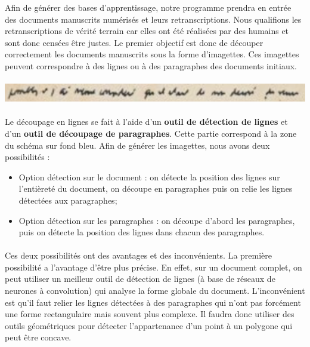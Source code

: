 Afin de générer des bases d’apprentissage, notre programme prendra en entrée des documents manuscrits
numérisés et leurs retranscriptions. Nous qualifions les retranscriptions de vérité terrain car elles
ont été réalisées par des humains et sont donc censées être justes. Le premier objectif est donc de
découper correctement les documents manuscrits sous la forme d’imagettes. Ces imagettes peuvent
correspondre à des lignes ou à des paragraphes des documents initiaux.

\paragraph{}
\begin{mdframed}[frametitle={Exemple d'imagette}, innerbottommargin=10]
\begin{center}
\includegraphics[width=\linewidth]{imagette.png}
\end{center}
\end{mdframed}

\paragraph{}
Le découpage en lignes se fait à l’aide d’un \textbf{outil de détection de lignes} et d’un
\textbf{outil de découpage de paragraphes}. Cette partie correspond à la zone du schéma sur fond bleu.
Afin de générer les imagettes, nous avons deux possibilités :

\begin{itemize}
\item Option détection sur le document : on détecte la position des lignes sur l’entièreté du document,
on découpe en paragraphes puis on relie les lignes détectées aux paragraphes;

\item Option détection sur les paragraphes : on découpe d’abord les paragraphes, puis on détecte la position
des lignes dans chacun des paragraphes.
\end{itemize}

\paragraph{}
Ces deux possibilités ont des avantages et des inconvénients. La première possibilité a l’avantage d’être plus précise.
En effet, sur un document complet, on peut utiliser un meilleur outil de détection de lignes (à base de réseaux de
neurones à convolution) qui analyse la forme globale du document. L’inconvénient est qu’il faut relier les lignes
détectées à des paragraphes qui n’ont pas forcément une forme rectangulaire mais souvent plus complexe. Il faudra
donc utiliser des outils géométriques pour détecter l’appartenance d’un point à un polygone qui peut être concave.

